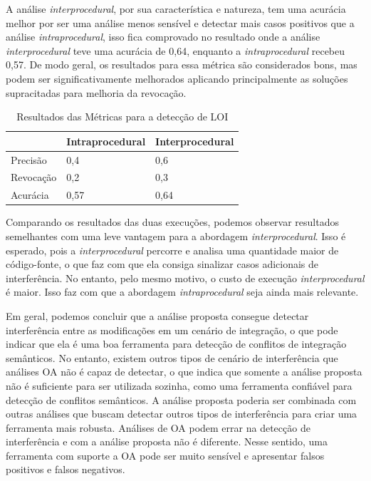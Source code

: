 A análise \emph{interprocedural}, por sua característica e natureza, tem uma acurácia melhor por ser uma análise menos sensível e detectar mais casos positivos que a análise \emph{intraprocedural}, isso fica comprovado no resultado onde a análise \emph{interprocedural} teve uma acurácia de 0,64, enquanto a \emph{intraprocedural} recebeu 0,57. De modo geral, os resultados para essa métrica são considerados bons, mas podem ser significativamente melhorados aplicando principalmente as soluções supracitadas para melhoria da revocação.

\begin{table}[!h]
    \centering
    \begin{tabular}{ l  l  l }
        \hline
                  & Intraprocedural & Interprocedural  \\
        \hline
        Precisão & 0,4 & 0,6 \\
        \hline
        Revocação & 0,2 & 0,3 \\
        \hline
        Acurácia  & 0,57 & 0,64 \\
        \hline
        
    \end{tabular}
    \caption{Resultados das Métricas para a detecção de LOI}
    \label{tab:metrics-loi}
\end{table}

Comparando os resultados das duas execuções, podemos observar resultados semelhantes com uma leve vantagem para a abordagem \emph{interprocedural}. Isso é esperado, pois a \emph{interprocedural} percorre e analisa uma quantidade maior de código-fonte, o que faz com que ela consiga sinalizar casos adicionais de interferência. No entanto, pelo mesmo motivo, o custo de execução \emph{interprocedural} é maior. Isso faz com que a abordagem \emph{intraprocedural} seja ainda mais relevante. 

Em geral, podemos concluir que a análise proposta consegue detectar interferência entre as modificações em um cenário de integração, o que pode indicar que ela é uma boa ferramenta para detecção de conflitos de integração semânticos. No entanto,  existem outros tipos de cenário de interferência que análises OA não é capaz de detectar, o que indica que somente a análise proposta não é suficiente para ser utilizada sozinha, como uma ferramenta confiável para detecção de conflitos semânticos. A análise proposta poderia ser combinada com outras análises que buscam detectar outros tipos de interferência para criar uma ferramenta mais robusta. Análises de OA podem errar na detecção de interferência e com a análise proposta não é diferente. Nesse  sentido, uma ferramenta com suporte a OA pode ser muito sensível e apresentar falsos positivos e falsos negativos.

